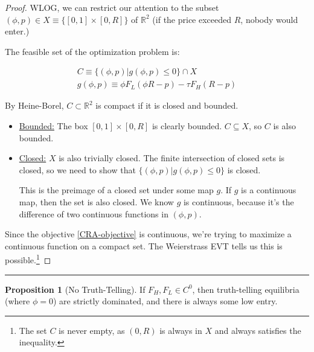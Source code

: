 \documentclass{article}
\theoremstyle{definition}
\newtheorem{proposition}{Proposition}
\begin{document}
\begin{proof}
WLOG, we can restrict our attention to the subset $(\phi, p) \in X \equiv \{[0, 1] \times [0, R]\}$ of $\mathbb{R}^2$ (if the price exceeded $R$, nobody would enter.)

The feasible set of the optimization problem is: 

\begin{align}
    \label{set-C}
    C \equiv \{(\phi, p) | g(\phi, p) \leq 0\} \cap X \\ 
    g(\phi, p) \equiv  \phi F_L(\phi R - p) - \tau F_H (R - p)
\end{align}

By Heine-Borel, $C \subset \mathbb{R}^2$ is compact if it is closed and bounded. 

\begin{itemize}
    \item \underline{Bounded:} The box $[0, 1] \times [0, R]$ is clearly bounded. $C \subseteq X$, so $C$ is also bounded.

    \item \underline{Closed:} $X$ is also trivially closed. The finite intersection of closed sets is closed, so we need to show that $\{(\phi, p) | g(\phi, p) \leq 0\}$  is closed. 
    
    This is the preimage of a closed set under some map $g$. If $g$ is a continuous map, then the set is also closed. We know $g$ is continuous, because it's the difference of two continuous functions in $(\phi, p)$.
    
\end{itemize}

Since the objective \eqref{CRA-objective} is continuous, we're trying to maximize a continuous function on a compact set. The Weierstrass EVT tells us this is possible.\footnote{The set $C$ is never empty, as $(0, R)$ is always in $X$ and always satisfies the inequality.}
\end{proof}

\hrule \hspace{5 em} 

\begin{proposition}[No Truth-Telling] If $F_H, F_L \in C^0$, then truth-telling equilibria (where $\phi = 0$) are strictly dominated, and there is always some low entry.
\end{proposition}
\end{document}
